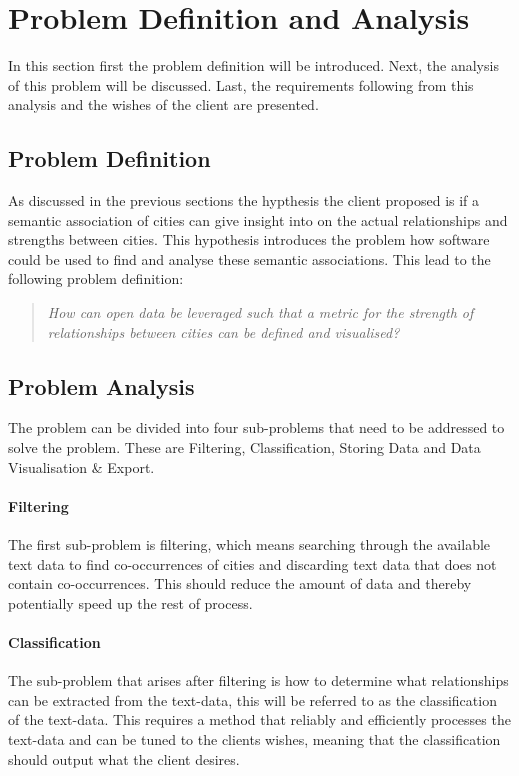 \chapter{Problem Definition and Analysis}\label{sec:problem-definition-analysis}
In this section first the problem definition will be introduced. Next, the analysis of this problem will be discussed. Last, the requirements following from this analysis and the wishes of the client are presented.

\section{Problem Definition}
As discussed in the previous sections the hypthesis the client proposed is if a semantic association of cities can give insight into on the actual relationships and strengths between cities. This hypothesis introduces the problem how software could be used to find and analyse these semantic associations. This lead to the following problem definition:\\

\begin{quote} 
\centering 
\textit{How can open data be leveraged such that a metric for the strength of relationships between cities can be defined and visualised?}
\end{quote}

\section{Problem Analysis}
The problem can be divided into four sub-problems that need to be addressed to solve the problem. These are Filtering, Classification, Storing Data and  Data Visualisation \& Export. 

\subsubsection{Filtering}
The first sub-problem is filtering, which means searching through the available text data to find co-occurrences of cities and discarding text data that does not contain co-occurrences. This should reduce the amount of data and thereby potentially speed up the rest of process.

\subsubsection{Classification}
The sub-problem that arises after filtering is how to determine what relationships can be extracted from the text-data, this will be referred to as the classification of the text-data. This requires a method that reliably and efficiently processes the text-data and can be tuned to the clients wishes, meaning that the classification should output what the client desires. 

